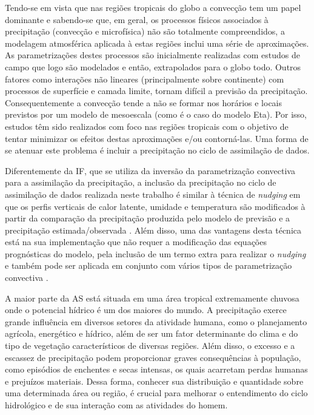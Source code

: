 Tendo-se em vista que nas regiões tropicais do globo a convecção tem um papel dominante e sabendo-se que, em geral, os processos físicos associados à precipitação (convecção e microfísica) não são totalmente compreendidos, a modelagem atmosférica aplicada à estas regiões inclui uma série de aproximações. As parametrizações destes processos são inicialmente realizadas com estudos de campo que logo são modelados e então, extrapolados para o globo todo. Outros fatores como interações não lineares (principalmente sobre continente) com processos de superfície e camada limite, tornam difícil a previsão da precipitação. Consequentemente a convecção tende a não se formar nos horários e locais previstos por um modelo de mesoescala (como é o caso do modelo Eta). Por isso, estudos têm sido realizados com foco nas regiões tropicais com o objetivo de tentar minimizar os efeitos destas aproximações e/ou contorná-las. Uma forma de se atenuar este problema é incluir a precipitação no ciclo de assimilação de dados.

Diferentemente da IF, que se utiliza da inversão da parametrização convectiva para a assimilação da precipitação, a inclusão da precipitação no ciclo de assimilação de dados realizada neste trabalho é similar à técnica de \textit{nudging} em que os perfis verticais de calor latente, umidade e temperatura são modificados à partir da comparação da precipitação produzida pelo modelo de previsão e a precipitação estimada/observada \cite{carrbaldwin91}. Além disso, uma das vantagens desta técnica está na sua implementação que não requer a modificação das equações prognósticas do modelo, pela inclusão de um termo extra para realizar o \textit{nudging} e também pode ser aplicada em conjunto com vários tipos de parametrização convectiva \cite{rogersetal05}.

A maior parte da AS está situada em uma área tropical extremamente chuvosa onde o potencial hídrico é um dos maiores do mundo. A precipitação exerce grande influência em diversos setores da atividade humana, como o planejamento agrícola, energético e hídrico, além de ser um fator determinante do clima e do tipo de vegetação característicos de diversas regiões. Além disso, o excesso e a escassez de precipitação podem proporcionar graves consequências à população, como episódios de enchentes e secas intensas, os quais acarretam perdas humanas e prejuízos materiais. Dessa forma, conhecer sua distribuição e quantidade sobre uma determinada área ou região, é crucial para melhorar o entendimento do ciclo hidrológico e de sua interação com as atividades do homem.

